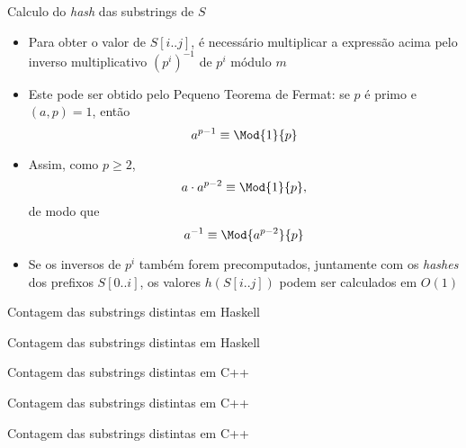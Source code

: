 \begin{frame}[fragile]{Calculo do {\it hash} das substrings de $S$}

    \begin{itemize}
        \item Para obter o valor de $S[i..j]$, é necessário multiplicar a expressão acima
            pelo inverso multiplicativo $(p^i)^{-1}$ de $p^i$ módulo $m$

        \item Este pode ser obtido pelo Pequeno Teorema de Fermat: se $p$ é primo e 
        $(a, p) = 1$, então
        \[
            a^{p-1}\equiv \Mod{1}{p}
        \]

        \item Assim, como $p \geq 2$,
        \[
            a\cdot a^{p-2}\equiv \Mod{1}{p},
        \]
        de modo que 
        \[
            a^{-1}\equiv \Mod{a^{p-2}}{p}
        \]

        \item Se os inversos de $p^i$ também forem precomputados, juntamente com os 
        \textit{hashes} dos prefixos $S[0..i]$, os valores $h(S[i..j])$ podem ser calculados
        em $O(1)$
    \end{itemize}

\end{frame}

\begin{frame}[fragile]{Contagem das substrings distintas em Haskell}
\end{frame}

\begin{frame}[fragile]{Contagem das substrings distintas em Haskell}
\end{frame}

\begin{frame}[fragile]{Contagem das substrings distintas em C++}
\end{frame}

\begin{frame}[fragile]{Contagem das substrings distintas em C++}
\end{frame}

\begin{frame}[fragile]{Contagem das substrings distintas em C++}
\end{frame}

